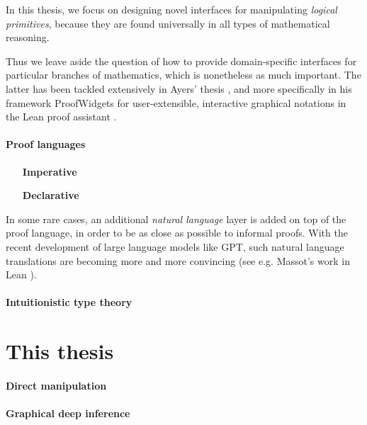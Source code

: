 \begin{emphpar}
  In this thesis, we focus on designing novel interfaces for manipulating
  \emph{logical primitives}, because they are found universally in all types of
  mathematical reasoning. 
\end{emphpar}

Thus we leave aside the question of how to provide domain-specific interfaces
for particular branches of mathematics, which is nonetheless as much
important. The latter has been tackled extensively in Ayers' thesis
, and more specifically in his framework ProofWidgets
for user-extensible, interactive graphical notations in the Lean proof
assistant
.

\paragraph{Proof languages}

\begin{itemize}
  \item[\textbf{Imperative}]
  \item[\textbf{Declarative}]
\end{itemize}

\begin{remark}
  In some rare cases, an additional \emph{natural language} layer is added on
  top of the proof language, in order to be as close as possible to informal
  proofs. With the recent development of large language models like GPT, such
  natural language translations are becoming more and more convincing (see e.g.
  Massot's work in Lean \cite{LeanIPAM}).
\end{remark}

\paragraph{Intuitionistic type theory}


\section{This thesis}
\paragraph{Direct manipulation}

\paragraph{Graphical deep inference}

